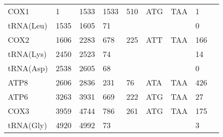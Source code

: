 \documentclass[../DISSERTACAO_MAIN.tex]{subfiles}
\begin{document}
\begin{longtable}{llllllllllllllllllllll}
			COX1         & \multicolumn{2}{l}{1}       & \multicolumn{2}{l}{1533}    & \multicolumn{2}{l}{1533}        & \multicolumn{3}{l}{510}                       & \multicolumn{3}{l}{ATG}   & \multicolumn{3}{l}{TAA}     & \multicolumn{3}{l}{1}           & \multicolumn{3}{l}{}         \\
			tRNA(Leu)    & \multicolumn{2}{l}{1535}    & \multicolumn{2}{l}{1605}    & \multicolumn{2}{l}{71}          & \multicolumn{3}{l}{}                          & \multicolumn{3}{l}{}      & \multicolumn{3}{l}{}        & \multicolumn{3}{l}{0}           & \multicolumn{3}{l}{}         \\
			COX2         & \multicolumn{2}{l}{1606}    & \multicolumn{2}{l}{2283}    & \multicolumn{2}{l}{678}         & \multicolumn{3}{l}{225}                       & \multicolumn{3}{l}{ATT}   & \multicolumn{3}{l}{TAA}     & \multicolumn{3}{l}{166}         & \multicolumn{3}{l}{}         \\
			tRNA(Lys)    & \multicolumn{2}{l}{2450}    & \multicolumn{2}{l}{2523}    & \multicolumn{2}{l}{74}          & \multicolumn{3}{l}{}                          & \multicolumn{3}{l}{}      & \multicolumn{3}{l}{}        & \multicolumn{3}{l}{14}          & \multicolumn{3}{l}{}         \\
			tRNA(Asp)    & \multicolumn{2}{l}{2538}    & \multicolumn{2}{l}{2605}    & \multicolumn{2}{l}{68}          & \multicolumn{3}{l}{}                          & \multicolumn{3}{l}{}      & \multicolumn{3}{l}{}        & \multicolumn{3}{l}{0}           & \multicolumn{3}{l}{}         \\
			ATP8         & \multicolumn{2}{l}{2606}    & \multicolumn{2}{l}{2836}    & \multicolumn{2}{l}{231}         & \multicolumn{3}{l}{76}                        & \multicolumn{3}{l}{ATA}   & \multicolumn{3}{l}{TAA}     & \multicolumn{3}{l}{426}         & \multicolumn{3}{l}{}         \\
			ATP6         & \multicolumn{2}{l}{3263}    & \multicolumn{2}{l}{3931}    & \multicolumn{2}{l}{669}         & \multicolumn{3}{l}{222}                       & \multicolumn{3}{l}{ATG}   & \multicolumn{3}{l}{TAA}     & \multicolumn{3}{l}{27}          & \multicolumn{3}{l}{}         \\
			COX3         & \multicolumn{2}{l}{3959}    & \multicolumn{2}{l}{4744}    & \multicolumn{2}{l}{786}         & \multicolumn{3}{l}{261}                       & \multicolumn{3}{l}{ATG}   & \multicolumn{3}{l}{TAA}     & \multicolumn{3}{l}{175}         & \multicolumn{3}{l}{}         \\
			tRNA(Gly)    & \multicolumn{2}{l}{4920}    & \multicolumn{2}{l}{4992}    & \multicolumn{2}{l}{73}          & \multicolumn{3}{l}{}                          & \multicolumn{3}{l}{}      & \multicolumn{3}{l}{}        & \multicolumn{3}{l}{3}           & \multicolumn{3}{l}{}         \\

\end{longtable}
\end{document}
